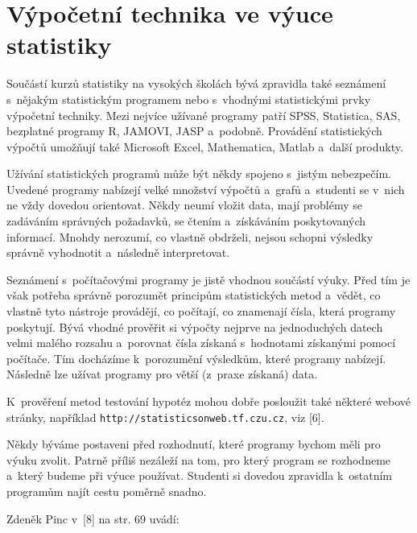 \section{Výpočetní technika ve výuce statistiky}

Součástí kurzů statistiky na vysokých školách bývá zpravidla také seznámení s~nějakým statistickým programem nebo s~vhodnými statistickými prvky
výpočetní techniky. Mezi nejvíce užívané programy patří SPSS, Statistica, SAS, bezplatné programy R, JAMOVI, JASP a~podobně. Provádění  statistických
výpočtů umožňují také Microsoft Excel, Mathematica, Matlab a~další produkty.

Užívání statistických programů může být někdy spojeno s~jistým nebezpečím.
Uvedené programy nabízejí velké množství výpočtů a~grafů a~studenti se v~nich ne vždy dovedou orientovat. Někdy neumí vložit data, mají problémy se zadáváním správných požadavků,
se čtením a~získáváním poskytovaných informací.
 Mnohdy nerozumí, co vlastně obdrželi, nejsou schopni výsledky správně vyhodnotit a~následně interpretovat.

 Seznámení s~počítačovými programy je jistě vhodnou součástí výuky.
   Před tím je však potřeba správně porozumět principům statistických metod a~vědět, co vlastně tyto nástroje
provádějí, co počítají, co znamenají čísla, která programy poskytují.
Bývá vhodné prověřit si výpočty nejprve na jednoduchých datech velmi malého rozsahu a~porovnat čísla získaná 
s~hodnotami získanými pomocí počítače. Tím docházíme k~porozumění výsledkům, které programy nabízejí. Následně lze užívat programy
pro větší  (z~praxe získaná) data.

K~prověření metod testování hypotéz mohou dobře posloužit také některé webové stránky, například
{\tt http://statisticsonweb.tf.czu.cz}, viz [6].

Někdy býváme postaveni před rozhodnutí, které programy bychom měli pro výuku zvolit. Patrně příliš nezáleží na tom, pro který
program se rozhodneme a~který budeme při výuce používat. Studenti si dovedou zpravidla k~ostatním
programům najít cestu poměrně snadno. 

Zdeněk Pinc v~[8] na str. 69 uvádí: 


